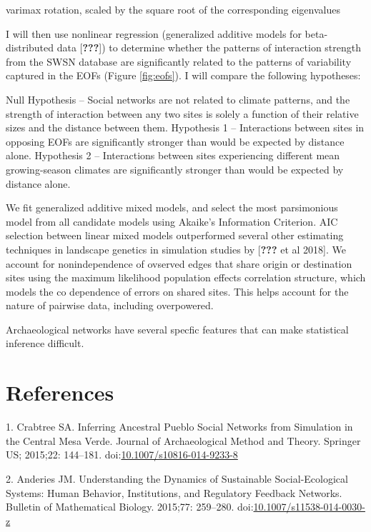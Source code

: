 \documentclass[10pt,letterpaper]{article}
\begin{document}
varimax rotation, scaled by the square root of the corresponding
eigenvalues

I will then use nonlinear regression (generalized additive models for
beta-distributed data {[}{\textbf{???}}{]}) to determine whether the
patterns of interaction strength from the SWSN database are
significantly related to the patterns of variability captured in the
EOFs (Figure \ref{fig:eofs}). I will compare the following hypotheses:

Null Hypothesis -- Social networks are not related to climate patterns,
and the strength of interaction between any two sites is solely a
function of their relative sizes and the distance between them.
Hypothesis 1 -- Interactions between sites in opposing EOFs are
significantly stronger than would be expected by distance alone.
Hypothesis 2 -- Interactions between sites experiencing different mean
growing-season climates are significantly stronger than would be
expected by distance alone.

We fit generalized additive mixed models, and select the most
parsimonious model from all candidate models using Akaike's Information
Criterion. AIC selection between linear mixed models outperformed
several other estimating techniques in landscape genetics in simulation
studies by {[}{\textbf{???}} et al 2018{]}. We account for
nonindependence of ovserved edges that share origin or destination sites
using the maximum likelihood population effects correlation structure,
which models the co dependence of errors on shared sites. This helps
account for the nature of pairwise data, including overpowered.

Archaeological networks have several specfic features that can make
statistical inference difficult.

\section*{References}\label{references}

\hypertarget{refs}{}
\hypertarget{ref-Crabtree2015}{}
1. Crabtree SA. Inferring Ancestral Pueblo Social Networks from
Simulation in the Central Mesa Verde. Journal of Archaeological Method
and Theory. Springer US; 2015;22: 144--181.
doi:\href{https://doi.org/10.1007/s10816-014-9233-8}{10.1007/s10816-014-9233-8}

\hypertarget{ref-Anderies2015}{}
2. Anderies JM. Understanding the Dynamics of Sustainable
Social-Ecological Systems: Human Behavior, Institutions, and Regulatory
Feedback Networks. Bulletin of Mathematical Biology. 2015;77: 259--280.
doi:\href{https://doi.org/10.1007/s11538-014-0030-z}{10.1007/s11538-014-0030-z}
\end{document}
